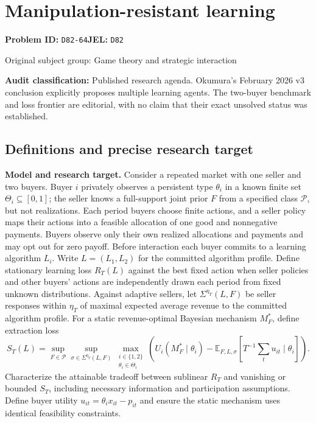 \documentclass[11pt,a4paper]{article}
\newcommand{\E}{\mathbb E}
\begin{document}
\section*{Manipulation-resistant learning}
\textbf{Problem ID:} \texttt{D82-64}\quad \textbf{JEL:} \texttt{D82}\par
\label{problem:OP-0287}
{\sffamily\small\color{muted}Original subject group: Game theory and strategic interaction\par}
\label{definitions:problem:30007569}
\textbf{Audit classification:} Published research agenda. Okumura’s February 2026 v3 conclusion explicitly proposes multiple learning agents. The two-buyer benchmark and loss frontier are editorial, with no claim that their exact unsolved status was established.
\subsection*{Definitions and precise research target}
\textbf{Model and research target.} Consider a repeated market with one seller and two buyers. Buyer \(i\) privately observes a persistent type \(\theta_i\) in a known finite set \(\Theta_i\subseteq[0,1]\); the seller knows a full-support joint prior \(F\) from a specified class \(\mathcal P\), but not realizations. Each period buyers choose finite actions, and a seller policy maps their actions into a feasible allocation of one good and nonnegative payments. Buyers observe only their own realized allocations and payments and may opt out for zero payoff. Before interaction each buyer commits to a learning algorithm \(L_i\). Write \(L=(L_1,L_2)\) for the committed algorithm profile. Define stationary learning loss \(R_T(L)\) against the best fixed action when seller policies and other buyers’ actions are independently drawn each period from fixed unknown distributions. Against adaptive sellers, let \(\Sigma^{\eta_T}(L,F)\) be seller responses within \(\eta_T\) of maximal expected average revenue to the committed algorithm profile. For a static revenue-optimal Bayesian mechanism \(M_F^*\), define extraction loss
\[
 S_T(L)=\sup_{F\in\mathcal P}\sup_{\sigma\in\Sigma^{\eta_T}(L,F)}\max_{\substack{i\in\{1,2\}\\\theta_i\in\Theta_i}}
 \left(U_i(M_F^*\mid\theta_i)-\E_{F,L,\sigma}[T^{-1}\textstyle\sum_t u_{it}\mid\theta_i]\right).
\]
Characterize the attainable tradeoff between sublinear \(R_T\) and vanishing or bounded \(S_T\), including necessary information and participation assumptions. Define buyer utility \(u_{it}=\theta_i x_{it}-p_{it}\) and ensure the static mechanism uses identical feasibility constraints.
\end{document}
